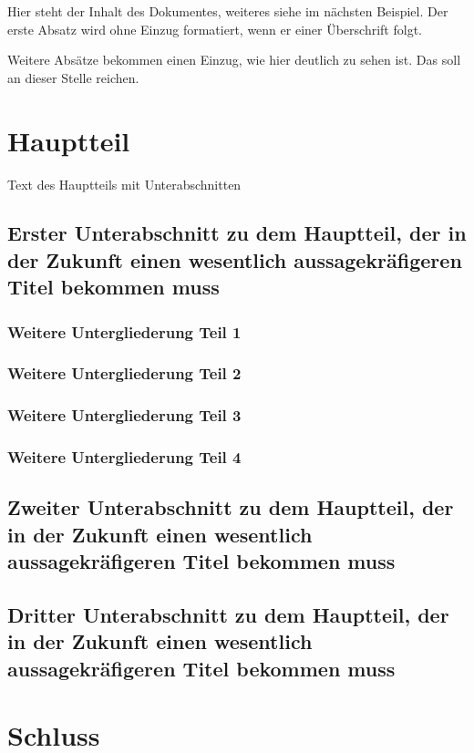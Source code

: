 \documentclass[ngerman]{scrartcl}     %
\begin{document}
  Hier steht der Inhalt des Dokumentes, weiteres siehe im n\"achsten
  Beispiel. Der erste Absatz wird ohne Einzug formatiert, wenn er einer \"Uberschrift folgt.
  
  Weitere Absätze bekommen einen Einzug, wie hier deutlich zu sehen ist.
  Das soll an dieser Stelle reichen.
  
  \section{Hauptteil}
  
  Text des Hauptteils mit Unterabschnitten
  
  \subsection[Erster Unterabschnitt]{Erster Unterabschnitt zu
dem Hauptteil, der in der Zukunft einen wesentlich aussagekräfigeren
Titel bekommen muss}

  \subsubsection{Weitere Untergliederung Teil 1}
  \subsubsection{Weitere Untergliederung Teil 2}
  \subsubsection{Weitere Untergliederung Teil 3}
  \subsubsection{Weitere Untergliederung Teil 4}

  \subsection[Zweiter Unterabschnitt]{Zweiter Unterabschnitt zu
dem Hauptteil, der in der Zukunft einen wesentlich aussagekräfigeren
Titel bekommen muss}
  
  \subsection[Dritter Unterabschnitt]{Dritter Unterabschnitt zu
dem Hauptteil, der in der Zukunft einen wesentlich aussagekräfigeren
Titel bekommen muss}
  
  \section{Schluss}
  
\end{document}
